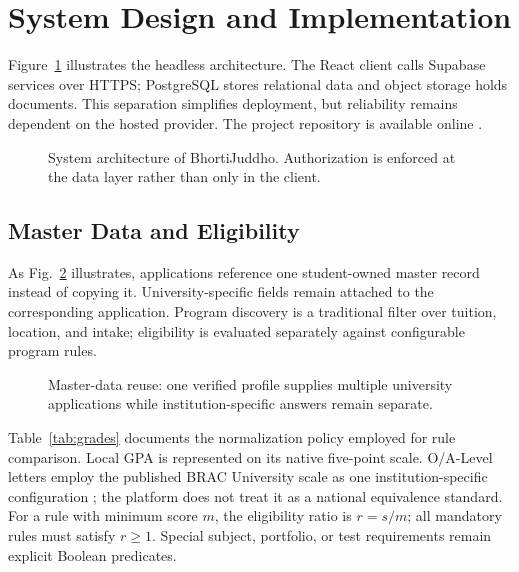 \documentclass[conference,letterpaper]{IEEEtran}
\begin{document}
\section{System Design and Implementation}
Figure~\ref{fig:architecture} illustrates the headless architecture. The React client calls Supabase services over HTTPS; PostgreSQL stores relational data and object storage holds documents. This separation simplifies deployment, but reliability remains dependent on the hosted provider. The project repository is available online \cite{repository}.

\begin{figure}[!t]
\centering
\resizebox{0.67\columnwidth}{!}{}
\caption{System architecture of BhortiJuddho. Authorization is enforced at the data layer rather than only in the client.}
\label{fig:architecture}
\end{figure}

\subsection{Master Data and Eligibility}
As Fig.~\ref{fig:master-data} illustrates, applications reference one student-owned master record instead of copying it. University-specific fields remain attached to the corresponding application. Program discovery is a traditional filter over tuition, location, and intake; eligibility is evaluated separately against configurable program rules.

\begin{figure}[!t]
\centering

\caption{Master-data reuse: one verified profile supplies multiple university applications while institution-specific answers remain separate.}
\label{fig:master-data}
\end{figure}

Table~\ref{tab:grades} documents the normalization policy employed for rule comparison. Local GPA is represented on its native five-point scale. O/A-Level letters employ the published BRAC University scale as one institution-specific configuration \cite{bracgrades}; the platform does not treat it as a national equivalence standard. For a rule with minimum score $m$, the eligibility ratio is $r=s/m$; all mandatory rules must satisfy $r\geq1$. Special subject, portfolio, or test requirements remain explicit Boolean predicates.
\end{document}
